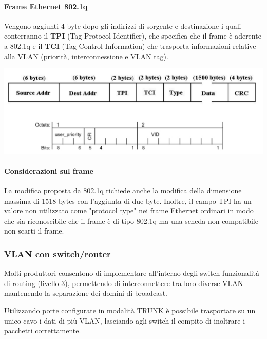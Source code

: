 \documentclass{report}
\begin{document}
\hypertarget{header-n342}{%
\paragraph{Frame Ethernet 802.1q}\label{header-n342}}

Vengono aggiunti 4 byte dopo gli indirizzi di sorgente e destinazione i
quali conterranno il \textbf{TPI} (Tag Protocol Identifier), che
specifica che il frame è aderente a 802.1q e il \textbf{TCI} (Tag
Control Information) che trasporta informazioni relative alla VLAN
(priorità, interconnessione e VLAN tag).

\begin{center}
		\includegraphics[width=0.7\linewidth]{frame-vlan}
	\end{center}

\hypertarget{header-n345}{%
\paragraph{Considerazioni sul frame}\label{header-n345}}

La modifica proposta da 802.1q richiede anche la modifica della
dimensione massima di 1518 bytes con l'aggiunta di due byte. Inoltre, il
campo TPI ha un valore non utilizzato come "protocol type" nei frame
Ethernet ordinari in modo che sia riconoscibile che il frame è di tipo
802.1q ma una scheda non compatibile non scarti il frame.

\hypertarget{header-n347}{%
\subsubsection{VLAN con switch/router}\label{header-n347}}

Molti produttori consentono di implementare all'interno degli switch
funzionalità di routing (livello 3), permettendo di interconnettere tra
loro diverse VLAN mantenendo la separazione dei domini di broadcast.

Utilizzando porte configurate in modalità TRUNK è possibile trasportare
su un unico cavo i dati di più VLAN, lasciando agli switch il compito di
inoltrare i pacchetti correttamente.
\end{document}
